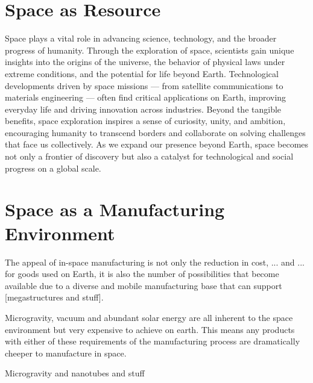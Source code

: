 \section{Space as Resource}
Space plays a vital role in advancing science, technology, and the broader progress of humanity. Through the exploration of space, scientists gain unique insights into the origins of the universe, the behavior of physical laws under extreme conditions, and the potential for life beyond Earth. Technological developments driven by space missions — from satellite communications to materials engineering — often find critical applications on Earth, improving everyday life and driving innovation across industries. Beyond the tangible benefits, space exploration inspires a sense of curiosity, unity, and ambition, encouraging humanity to transcend borders and collaborate on solving challenges that face us collectively. As we expand our presence beyond Earth, space becomes not only a frontier of discovery but also a catalyst for technological and social progress on a global scale.



\section{Space as a Manufacturing Environment}
The appeal of in-space manufacturing is not only the reduction in cost, ... and ... for goods used on Earth, it is also the number of possibilities that become available due to a diverse and mobile manufacturing base that can support [megastructures and stuff].

Microgravity, vacuum and abundant solar energy are all inherent to the space environment but very expensive to achieve on earth. This means any products with either of these requirements of the manufacturing process are dramatically cheeper to manufacture in space.

Microgravity and nanotubes and stuff


